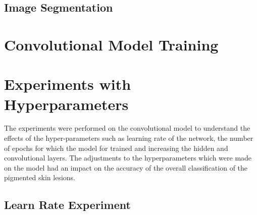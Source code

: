\subsection{ Image Segmentation }

\pagebreak
\section{Convolutional Model Training}


\pagebreak
\section{Experiments with Hyperparameters}
The experiments were performed on the convolutional model to understand the effects of the hyper-parameters 
such as learning rate of the network, the number of epochs for which the model for trained and increasing the hidden  
and convolutional layers. The adjustments to the hyperparameters which were made on the model had an impact on the accuracy of the overall classification of the pigmented skin lesions.
\subsection{Learn Rate Experiment}

